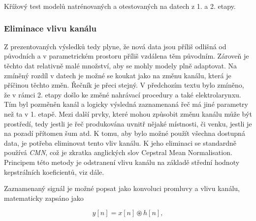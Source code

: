 
\begin{table}[htpb]
  \centering
  \def\arraystretch{1.5}
  \caption{Křížový test modelů natrénovaných a otestovaných na datech z 1. a 2. etapy.}
  \label{tab:experiments:normalization:cross}
\end{table}


\subsubsection{Eliminace vlivu kanálu}

Z prezentovaných výsledků tedy plyne, že nová data jsou příliš odlišná od původních a v parametrickém prostoru příliš vzdálena těm původním. Zároveň je těchto dat relativně malé množství, aby se mohly modely plně adaptovat. Na zmíněný rozdíl v datech je možné se koukat jako na změnu kanálu, která je příčinou těchto změn. Řečník je přeci stejný. V předchozím textu bylo zmíněno, že v rámci 2. etapy došlo ke změné nahrávací procedury a také elektrolarynxu. Tím byl pozměněn kanál a logicky výsledná zaznamenaná řeč má jiné parametry než ta v 1. etapě. Mezi další prvky, které mohou způsobit změnu kanálu může být prostředí, tedy jestli je řeč produkována uvnitř nějaké místnosti, či venku, jestli je na pozadí přítomen šum atd. K tomu, aby bylo možné použít všechna dostupná data, je potřeba eliminovat tento vliv kanálu. K jeho eliminaci se standardně používá \textit{CMN},  což je zkratka anglických slov Cepstral Mean Normalisation. Principem této metody je odstranení vlivu kanálu na základě střední hodnoty kepstrálních koeficientů, viz dále.

Zaznamenaný signál je možné popsat jako konvoluci promluvy a vlivu kanálu, matematicky zapsáno jako

\begin{equation}
  y\left[n\right] = x\left[n\right] \circledast h\left[n\right],
  \label{eq:experiments:normalization:convolution}
\end{equation}

